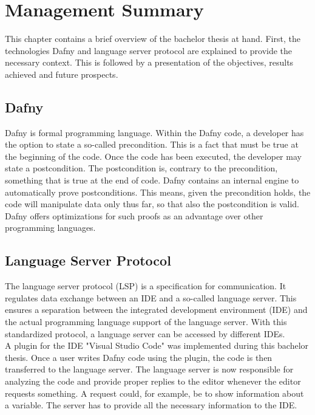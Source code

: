 \section{Management Summary}
\label{section:management_summary}


This chapter contains a brief overview of the bachelor thesis at hand.
First, the technologies Dafny and language server protocol are explained to provide the necessary context.
This is followed by a presentation of the objectives, results achieved and future prospects.

\subsection{Dafny}
\label{section:management_summary:dafny}
Dafny is formal programming language.
Within the Dafny code, a developer has the option to state a so-called precondition.
This is a fact that must be true at the beginning of the code.
Once the code has been executed, the developer may state a postcondition.
The postcondition is, contrary to the precondition, something that is true at the end of code.
Dafny contains an internal engine to automatically prove postconditions.
This means, given the precondition holds, the code will manipulate data only thus far, so that also the postcondition is valid.
Dafny offers optimizations for such proofs as an advantage over other programming languages.

\subsection{Language Server Protocol}
The language server protocol (LSP) is a specification for communication. 
It regulates data exchange between an IDE and a so-called language server.
This ensures a separation between the integrated development environment (IDE) and the actual programming language support of the language server. 
With this standardized protocol, a language server can be accessed by different IDEs. \\

A plugin for the IDE "Visual Studio Code" was implemented during this bachelor thesis. 
Once a user writes Dafny code using the plugin, the code is then transferred to the language server.
The language server is now responsible for analyzing the code and provide proper replies to the editor whenever the editor requests something.
A request could, for example, be to show information about a variable.
The server has to provide all the necessary information to the IDE.\\

